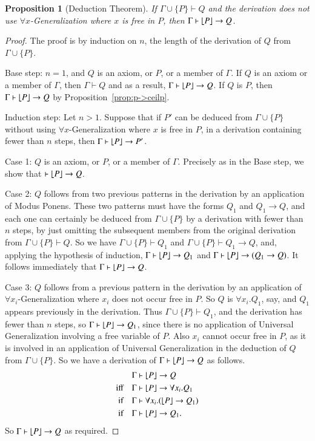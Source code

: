 \documentclass{article}
\theoremstyle{plain}
\newtheorem{prop}[thm]{Proposition}
\DeclarePairedDelimiter\floor{\lfloor}{\rfloor}
\begin{document}
\begin{prop}[Deduction Theorem]
If $\Gamma \cup \{P\} \vdash Q$ and the derivation does not use \mbox{$\forall x$-Generalization} where $x$ is free in $P$, then $\Gamma \vdash \floor*{P} \to Q$. 
\end{prop}
\begin{proof}
The proof is by induction on $n$, the length of the derivation of $Q$ from $\Gamma \cup \{P\}$.

Base step: $n = 1$, and $Q$ is an axiom, or $P$, or a member of $\Gamma$. If $Q$ is an axiom or a member of $\Gamma$, then $\Gamma \vdash Q$ and as a result, $\Gamma \vdash \floor*{P} \to Q$. If $Q$ is $P$, then $\Gamma \vdash \floor*{P} \to Q$ by Proposition~\ref{prop:p->ceilp}.

Induction step: Let $n > 1$. Suppose that if $P'$ can be deduced from $\Gamma \cup \{P\}$ without using $\forall x$-Generalization where $x$ is free in $P$, in a derivation containing fewer than $n$ steps, then $\Gamma \vdash \floor*{P} \to P'$.

Case 1: $Q$ is an axiom, or $P$, or a member of $\Gamma$. Precisely as in the Base step, we show that $\vdash \floor*{P} \to Q$.

Case 2: $Q$ follows from two previous patterns in the derivation by an application of Modus Ponens. These two patterns must have the forms $Q_1$ and $Q_1 \to Q$, and each one can certainly be deduced from $\Gamma \cup \{P\}$ by a derivation with fewer than $n$ steps, by just omitting the subsequent members from the original derivation from $\Gamma \cup \{P\} \vdash Q$. So we have $\Gamma \cup \{P\} \vdash Q_1$ and $\Gamma \cup \{P\} \vdash Q_1 \to Q$, and, applying the hypothesis of induction, $\Gamma \vdash \floor*{P} \to Q_1$ and $\Gamma \vdash \floor*{P} \to (Q_1 \to Q)$. It follows immediately that $\Gamma \vdash \floor*{P} \to Q$.

Case 3: $Q$ follows from a previous pattern in the derivation by an application of $\forall x_i$-Generalization where $x_i$ does not occur free in $P$. So $Q$ is $\forall x_i . Q_1$, say, and $Q_1$ appears previously in the derivation. Thus $\Gamma \cup \{P\} \vdash Q_1$, and the derivation has fewer than $n$ steps, so $\Gamma \vdash \floor*{P} \to Q_1$, since there is no application of Universal Generalization involving a free variable of $P$. Also $x_i$ cannot occur free in $P$, as it is involved in an application of Universal Generalization in the deduction of $Q$ from $\Gamma \cup \{P\}$. So we have a derivation of $\Gamma \vdash \floor*{P} \to Q$ as follows.
\begin{align*}
\Gamma &\vdash \floor*{P} \to Q \\
{\text{iff} \quad} \Gamma &\vdash \floor*{P} \to \forall x_i . Q_1 \\
{\text{if} \quad} \Gamma &\vdash \forall x_i . (\floor*{P} \to Q_1) \\
{\text{if} \quad} \Gamma &\vdash \floor*{P} \to Q_1. \\
\end{align*}
So $\Gamma \vdash \floor*{P} \to Q$ as required.


\end{proof}
\end{document}
